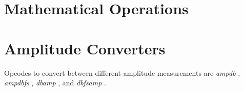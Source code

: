 \begin{comment}
\documentclass[10pt]{article}
\usepackage{fullpage, graphicx, url}
\setlength{\parskip}{1ex}
\setlength{\parindent}{0ex}
\title{Mathematical Operations}



\begin{tabular}{ccc}
The Alternative Csound Reference Manual & & \\
Previous & &Next

\end{tabular}

\end{comment}
\section{Mathematical Operations}
\section{Amplitude Converters}


  Opcodes to convert between different amplitude measurements are \emph{ampdb}
, \emph{ampdbfs}
, \emph{dbamp}
, and \emph{dbfsamp}
. 


\begin{comment}
\begin{tabular}{lcr}
Previous &Home &Next \\
Table Selection &Up &Arithmetic and Logic Operations

\end{tabular}



\end{comment}
